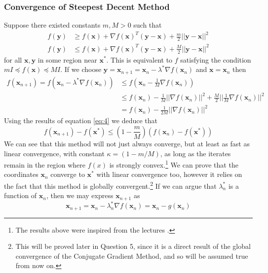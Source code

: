 \documentclass[10pt,a4paper,notitlepage]{article}
\newcommand{\abs}[1]{\lvert#1\rvert}
\newcommand{\x}{\mathbf{x}}
\newcommand{\y}{\mathbf{y}}
\begin{document}
\subsubsection*{\centering Convergence of Steepest Decent Method}
Suppose there existed constants $m, M>0$ such that
\begin{equation}
\begin{aligned}
f(\y) &\geq f(\x) +\nabla f(\x)^{T}(\y-\x)+\frac{m}{2}\abs{\abs{\y-\x}}^{2}\\
f(\y) &\leq f(\x) +\nabla f(\x)^{T}(\y-\x)+\frac{M}{2}\abs{\abs{\y-\x}}^{2}
\end{aligned}
\end{equation}
for all $\x,\y$ in some region near $\x^{*}$. This is equivalent to $f$ satisfying the condition $mI\preceq f(\x)\preceq MI$. If we choose $\y=\x_{n+1}=\x_{n}-\lambda^{*}\nabla f(\x_{n})$ and $\x=\x_{n}$ then
\begin{equation}
\begin{aligned}
f(\x_{n+1})=f\left(\x_{n}-\lambda^{*}\nabla f(\x_{n})\right) &\leq f\left(\x_{n}-\frac{1}{M}\nabla f(\x_{n})\right)\\
&\leq f(\x_{n})-\frac{1}{M}\abs{\abs{\nabla f(\x_{n})}}^{2}+\frac{M}{2}\abs{\abs{\frac{1}{M}\nabla f(\x_{n})}}^{2}\\
&=f(\x_{n})-\frac{1}{2M}\abs{\abs{\nabla f(\x_{n})}}^{2}
\end{aligned}
\end{equation}
Using the results of equation \eqref{eq:4} we deduce that
\begin{equation}
f(\x_{n+1})-f(\x^{*})\leq \left(1-\frac{m}{M}\right)\left(f(\x_{n})-f(\x^{*})\right)
\end{equation}
We can see that this method will not just always converge, but at least as fast as linear convergence, with constant $\kappa=(1-m/M)$, as long as the iterates remain in the region where $f(x)$ is strongly convex.\footnote{The results above were inspired from the lectures \cite{Caramanis}.} We can prove that the coordinates $\x_{n}$ converge to $\x^{*}$ with linear convergence too, however it relies on the fact that this method is globally convergent.\footnote{This will be proved later in Question 5, since it is a direct result of the global convergence of the Conjugate Gradient Method, and so will be assumed true from now on.} If we can argue that $\lambda^{*}_{n}$ is a function of $\x_{n}$, then we may express $\x_{n+1}$ as
\begin{equation}
\x_{n+1}=\x_{n}-\lambda^{*}_{n}\nabla f(\x_{n})=\x_{n}-g(\x_{n})
\end{equation}
\end{document}
